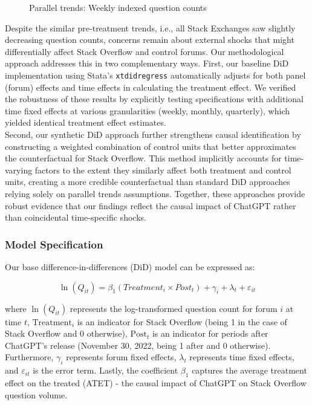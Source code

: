\begin{figure}[H]
    \centering
    
    \caption{Parallel trends: Weekly indexed question counts}
    \label{fig:paralleL_trend_trans}
\end{figure}

Despite the similar pre-treatment trends, i.e., all Stack Exchanges saw slightly decreasing question counts, concerns remain about external shocks that might differentially affect Stack Overflow and control forums. Our methodological approach addresses this in two complementary ways. First, our baseline DiD implementation using Stata's \texttt{xtdidregress} automatically adjusts for both panel (forum) effects and time effects in calculating the treatment effect. We verified the robustness of these results by explicitly testing specifications with additional time fixed effects at various granularities (weekly, monthly, quarterly), which yielded identical treatment effect estimates.\\

Second, our synthetic DiD approach further strengthens causal identification by constructing a weighted combination of control units that better approximates the counterfactual for Stack Overflow. This method implicitly accounts for time-varying factors to the extent they similarly affect both treatment and control units, creating a more credible counterfactual than standard DiD approaches relying solely on parallel trends assumptions. Together, these approaches provide robust evidence that our findings reflect the causal impact of ChatGPT rather than coincidental time-specific shocks.


\subsubsection{Model Specification}
Our base difference-in-differences (DiD) model can be expressed as:

\begin{equation}\label{eq:basedid}
\ln(Q_{it}) = \beta_1(Treatment_i \times Post_t) + \gamma_i + \lambda_t + \varepsilon_{it}
\end{equation}

where $\ln(Q_{it})$ represents the log-transformed question count for forum $i$ at time $t$, $\text{Treatment}_i$ is an indicator for Stack Overflow (being 1 in the case of Stack Overflow and 0 otherwise), $\text{Post}_t$ is an indicator for periods after ChatGPT's release (November 30, 2022, being 1 after and 0 otherwise).  Furthermore, $\gamma_i$ represents forum fixed effects, $\lambda_t$ represents time fixed effects, and $\varepsilon_{it}$ is the error term. Lastly, the coefficient $\beta_1$ captures the average treatment effect on the treated (ATET) - the causal impact of ChatGPT on Stack Overflow question volume.\\

